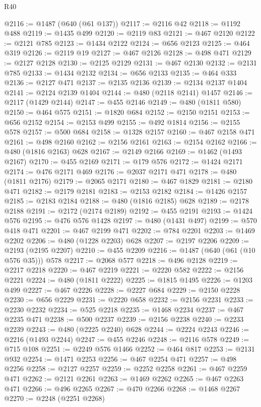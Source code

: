 \begin{lexlean}{R40}
\begin{coremodule}
{{{{{{{{{{{{{{{{{{{{{{{{{{{{{{{{{{{{{{{{{{{{{{{{{{{{{{{{{{{{{{{{{{{{{{{{{{{{{{{{{{{{{{{{{{{{{{{{{{{{{{{{{{{{{@2116 := @1487 (@640 (@61 @137))
@2117 := @2116 @42
@2118 := @1192 @488
@2119 := @1435 @499
@2120 := @2119 @83
@2121 := @467 @2120
@2122 := @2121 @785
@2123 := @1434 @2122
@2124 := @656 @2123
@2125 := @464 @319
@2126 := @2119 @19
@2127 := @467 @2126
@2128 := @498 @471
@2129 := @2127 @2128
@2130 := @2125 @2129
@2131 := @467 @2130
@2132 := @2131 @785
@2133 := @1434 @2132
@2134 := @656 @2133
@2135 := @464 @333
@2136 := @2127 @471
@2137 := @2135 @2136
@2139 := @2134 @2137 @1404
@2141 := @2124 @2139 @1404
@2144 := @480 (@2118 @2141) @1457
@2146 := @2117 (@1429 @2144)
@2147 := @455 @2146
@2149 := @480 (@1811 @580)
@2150 := @464 @575
@2151 := @1820 @684
@2152 := @2150 @2151
@2153 := @656 @2152
@2154 := @2153 @499
@2155 := @492 @1814
@2156 := @2155 @578
@2157 := @500 @684
@2158 := @1328 @2157
@2160 := @467 @2158 @471
@2161 := @498 @2160
@2162 := @2156 @2161
@2163 := @2154 @2162
@2166 := @480 (@1816 @2163) @628
@2167 := @2149 @2166
@2169 := @1462 (@1493 @2167)
@2170 := @455 @2169
@2171 := @179 @576
@2172 := @1424 @2171
@2174 := @476 @2171 @469
@2176 := @2037 @2171 @471
@2178 := @480 (@1811 @2176)
@2179 := @2065 @2171
@2180 := @467 @1829
@2181 := @2180 @471
@2182 := @2179 @2181
@2183 := @2153 @2182
@2184 := @1426 @2157
@2185 := @2183 @2184
@2188 := @480 (@1816 @2185) @628
@2189 := @2178 @2188
@2191 := @2172 (@2174 @2189)
@2192 := @455 @2191
@2193 := @1424 @576
@2195 := @476 @576 @1428
@2197 := @480 (@1431 @497)
@2199 := @570 @418 @471
@2201 := @467 @2199 @471
@2202 := @784 @2201
@2203 := @1469 @2202
@2206 := @480 (@1228 @2203) @628
@2207 := @2197 @2206
@2209 := @2193 (@2195 @2207)
@2210 := @455 @2209
@2216 := @1487 (@640 (@61 (@10 @576 @35))) @578
@2217 := @2068 @577
@2218 := @496 @2128
@2219 := @2217 @2218
@2220 := @467 @2219
@2221 := @2220 @582
@2222 := @2156 @2221
@2224 := @480 (@1811 @2222)
@2225 := @1815 @1495
@2226 := @1203 @499
@2227 := @467 @2226
@2228 := @2227 @684
@2229 := @2150 @2228
@2230 := @656 @2229
@2231 := @2220 @658
@2232 := @2156 @2231
@2233 := @2230 @2232
@2234 := @525 @2218
@2235 := @1468 @2234
@2237 := @467 @2235 @471
@2238 := @500 @2237
@2239 := @2156 @2238
@2240 := @2233 @2239
@2243 := @480 (@2225 @2240) @628
@2244 := @2224 @2243
@2246 := @2216 (@1493 @2244)
@2247 := @455 @2246
@2248 := @2116 @578
@2249 := @715 @108
@2251 := @2249 @576 @1466
@2252 := @464 @817
@2253 := @2131 @932
@2254 := @1471 @2253
@2256 := @467 @2254 @471
@2257 := @498 @2256
@2258 := @2127 @2257
@2259 := @2252 @2258
@2261 := @467 @2259 @471
@2262 := @2121 @2261
@2263 := @1469 @2262
@2265 := @467 @2263 @471
@2266 := @496 @2265
@2267 := @470 @2266
@2268 := @1468 @2267
@2270 := @2248 (@2251 @2268)
}}}}}}}}}}}}}}}}}}}}}}}}}}}}}}}}}}}}}}}}}}}}}}}}}}}}}}}}}}}}}}}}}}}}}}}}}}}}}}}}}}}}}}}}}}}}}}}}}}}}}}}}}}}}}
\end{coremodule}
\end{lexlean}
